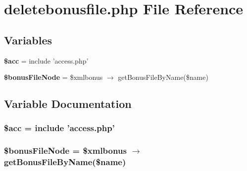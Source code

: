 \section{deletebonusfile.php File Reference}
\label{deletebonusfile_8php}


\subsection*{Variables}
\begin{CompactItemize}
\item 
{\bf \$acc} = include 'access.php'
\item 
{\bf \$bonus\-File\-Node} = \$xmlbonus $\rightarrow$ get\-Bonus\-File\-By\-Name(\$name)
\end{CompactItemize}


\subsection{Variable Documentation}
\subsubsection{\setlength{\rightskip}{0pt plus 5cm}\$acc = include 'access.php'}\label{deletebonusfile_8php_542926c588a05eb69553d79c83cf73da}


\subsubsection{\setlength{\rightskip}{0pt plus 5cm}\$bonus\-File\-Node = \$xmlbonus $\rightarrow$ get\-Bonus\-File\-By\-Name(\$name)}\label{deletebonusfile_8php_a421c2b5cc2f228a03e20c4bd8800d1e}


